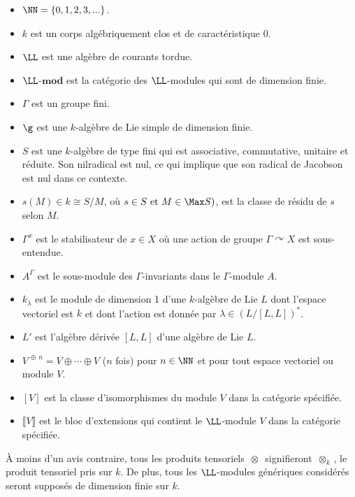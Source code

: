 \begin{itemize}
\item[\textbullet$\;$] $\NN = \{0,1,2,3,...\}$.
\item[\textbullet$\;$] $k$ est un corps algébriquement clos et de caractéristique 0.
\item[\textbullet$\;$] $\LL$ est une algèbre de courants tordue.
\item[\textbullet$\;$] $\LL$-$\mathbf{mod}$ est la catégorie des $\LL$-modules qui sont de dimension finie.
\item[\textbullet$\;$] $\Gamma$ est un groupe fini.
\item[\textbullet$\;$] $\g$ est une $k$-algèbre de Lie simple de dimension finie.
\item[\textbullet$\;$] $S$ est une $k$-algèbre de type fini qui est associative, commutative, unitaire et réduite. Son nilradical est nul, ce qui implique que son radical de Jacobson est nul dans ce contexte.
\item[\textbullet$\;$] $s(M) \in k \cong S / M$, où $s \in S \text{ et } M \in \Max S)$, est la classe de résidu de $s$ selon $M$.
\item[\textbullet$\;$] $\Gamma^x$ est le stabilisateur de $x \in X$ où une action de groupe $\Gamma \curvearrowright X$ est sous-entendue.
\item[\textbullet$\;$] $A^\Gamma$ est le sous-module des $\Gamma$-invariants dans le $\Gamma$-module $A$.
\item[\textbullet$\;$] $k_\lambda$ est le module de dimension 1 d'une $k$-algèbre de Lie $L$ dont l'espace vectoriel est $k$ et dont l'action est donnée par $\lambda \in (L/[L,L])^*$.
\item[\textbullet$\;$] $L'$ est l'algèbre dérivée $[L,L]$ d'une algèbre de Lie $L$.
\item[\textbullet$\;$] $V^{\,\oplus\, n} = V \oplus \cdots \oplus V$ ($n$ fois) pour $n \in \NN$ et pour tout espace vectoriel ou module $V$.
\item[\textbullet$\;$] $[V]$ est la classe d'isomorphismes du module $V$ dans la catégorie spécifiée.
\item[\textbullet$\;$] $\llbracket V \rrbracket$ est le bloc d'extensions qui contient le $\LL$-module $V$ dans la catégorie spécifiée.
\end{itemize}

À moins d'un avis contraire, tous les produits tensoriels $\,\otimes\,$ signifieront $\,\otimes_k\,$, le produit tensoriel pris sur $k$. De plus, tous les $\LL$-modules génériques considérés seront supposés de dimension finie sur $k$.

